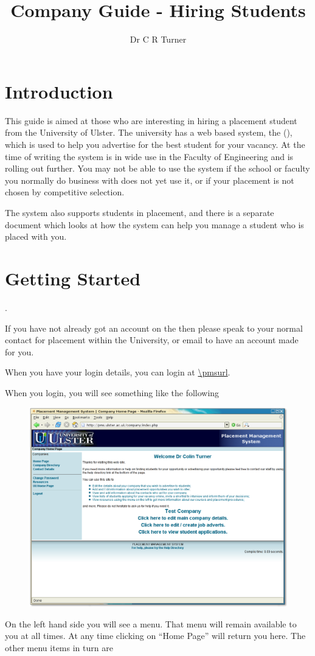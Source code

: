 \documentclass{article}
\author{Dr C R Turner}
\title{\pmslong \\ Company Guide - Hiring Students}
\begin{document}
\maketitle
\newpage
\section{Introduction}

This guide is aimed at those who are interesting in hiring a placement student from the
University of Ulster. The university has a web based system, the \pmslong (\pms),
which is used to help you advertise for the best student for your vacancy. At the time of
writing the system is in wide use in the Faculty of Engineering and is rolling out further.
You may not be able to use the system if the school or faculty you normally do business with
does not yet use it, or if your placement is not chosen by competitive selection.

The system also supports students in placement, and there is a separate document
which looks at how the system can help you manage a student who is placed with you.

\section{Getting Started}.

If you have not already got an account on the \pms then please speak to your normal contact
for placement within the University, or email
to have an account made for you.

When you have your login details, you can login at \url{\pmsurl}.

When you login, you will see something like the following
\begin{figure}[htb]
\begin{center}
\includegraphics[scale=0.25]{png/company_hr1.png}
\end{center}
\end{figure}
On the left hand side you will see a menu. That menu will remain available to you
at all times. At any time clicking on ``Home Page'' will return you here. The other menu
items in turn are
\end{document}

